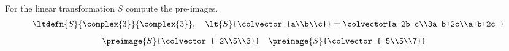 For the linear transformation $S$ compute the pre-images.
%
\begin{align*}
\ltdefn{S}{\complex{3}}{\complex{3}},\quad \lt{S}{\colvector{a\\b\\c}}=
\colvector{a-2b-c\\3a-b+2c\\a+b+2c }
\end{align*}
%
\begin{align*}
\preimage{S}{\colvector{-2\\5\\3}}&
&
\preimage{S}{\colvector{-5\\5\\7}}&
\end{align*}
%
